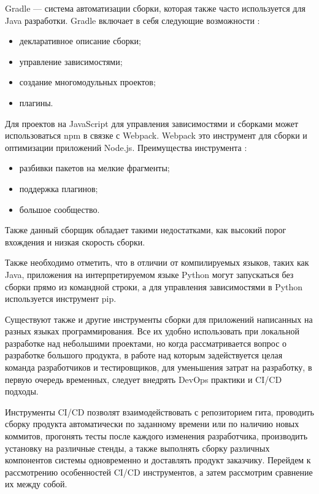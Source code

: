 Gradle — система автоматизации сборки, которая также часто используется для Java разработки. Gradle включает в себя следующие возможности \cite{gradle}:

\begin{itemize}
	\item декларативное описание сборки;
	\item управление зависимостями;
	\item создание многомодульных проектов;
	\item плагины.
\end{itemize}

Для проектов на JavaScript для управления зависимостями и сборками может использоваться npm в связке с Webpack. Webpack это инструмент для сборки и оптимизации приложений Node.js. Преимущества инструмента  \cite{webpack}:

\begin{itemize}
	\item разбивки пакетов на мелкие фрагменты;
	\item поддержка плагинов;
	\item большое сообщество.
\end{itemize}

Также данный сборщик обладает такими недостатками, как высокий порог вхождения и низкая скорость сборки.

Также необходимо отметить, что в отличии от компилируемых языков, таких как Java, приложения на интерпретируемом языке Python могут запускаться без сборки прямо из командной строки, а для управления зависимостями в Python используется инструмент pip.

Существуют также и другие инструменты сборки для приложений написанных на разных языках программирования. Все их удобно использовать при локальной разработке над небольшими проектами, но когда рассматривается вопрос о разработке большого продукта, в работе над которым задействуется целая команда разработчиков и тестировщиков, для уменьшения затрат на разработку, в первую очередь временных, следует внедрять DevOps практики и CI/CD подходы.

Инструменты CI/CD позволят взаимодействовать с репозиторием гита, проводить сборку продукта автоматически по заданному времени или по наличию новых коммитов, прогонять тесты после каждого изменения разработчика, производить установку на различные стенды, а также выполнять сборку различных компонентов системы одновременно и доставлять продукт заказчику. Перейдем к рассмотрению особенностей CI/CD инструментов, а затем рассмотрим сравнение их между собой.


